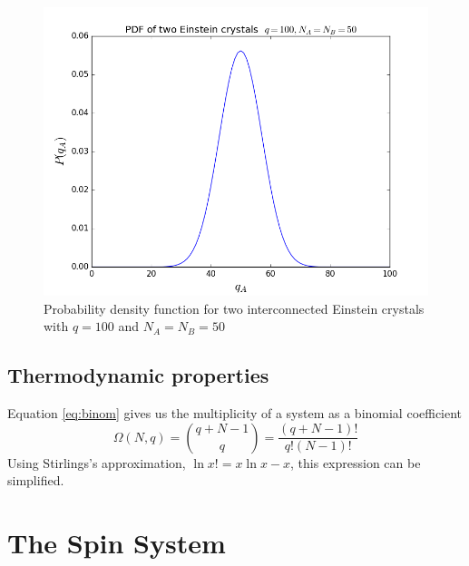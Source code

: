 \documentclass[10pt,a4paper]{amsart}
\begin{document}
\begin{figure}[h]
  \centering
  \includegraphics[width=0.9\linewidth]{EinsteinPDF.png}
  \caption{Probability density function for two interconnected Einstein crystals with $q=100$ and $N_A=N_B=50$}
  \label{fig:EinsteinPDF}
\end{figure}

\subsection{Thermodynamic properties}
Equation \ref{eq:binom} gives us the multiplicity of a system as a binomial coefficient
\begin{equation*}
\Omega(N,q)=\binom{q+N-1}{q}=\frac{(q+N-1)!}{q!(N-1)!}
\end{equation*}
Using Stirlings's approximation, $\ln x!=x\ln x-x$, this expression can be simplified.

\section{The Spin System}
\end{document}
